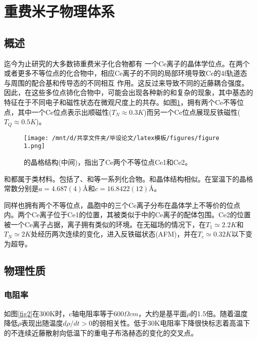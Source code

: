 \section{重费米子物理体系}
\subsection{概述}
迄今为止研究的大多数铈重费米子化合物都有 一个Ce离子的晶体学位点。在两个或者更多不等位点的化合物中，相应Ce离子的不同的局部环境导致Ce的4f轨道态与周围的配合基和传导态的不同相互 作用。这反过来导致不同的近藤耦合强度。因此，在这些多位点铈化合物中，可能会出现各种新的和复杂的现象，其中基态的特征在于不同电子和磁性状态在微观尺度上的共存。如图\ref{fig1}，拥有两个Ce不等位点，其中一个Ce位点表示出顺磁性($T_N \approx 0.3K$)而另一个Ce位点展现反铁磁性($T_Q \approx 0.5K$)。

\begin{figure}[h]
    \centering
    \texttt{[image: /mnt/d/共享文件夹/毕设论文/latex模板/figures/figure 1.png]}
    \caption{\Songti {}的晶格结构(中间)，指出了Ce两个不等位点Ce1和Ce2\cite{8}。}%
    \label{fig1}
\end{figure}


和都属于类材料。包括了、和等一系列化合物。和晶体结构相似。在室温下的晶格常数分别是$a=4.687(4)$\AA 和$c=16.8422(12)$\AA。

同样也拥有两个不等位点，晶胞中的三个Ce离子分布在晶体学上不等价的位点内。两个Ce离子位于Ce1的位置，其被类似于中的Ce离子的配体包围。Ce2的位置被一个Ce离子占据，离子拥有类似的环境。在无磁场的情况下，在$T_1 \simeq 2.2K$和$T_N \simeq 2K$处经历两次连续的变化，进入反铁磁状态(AFM)，并在$T_c \simeq 0.32K$以下变为超导。

\subsection{物理性质}
\subsubsection{电阻率}
如图\ref{fig2}在300K时，c轴电阻率等于$600 \Omega cm$，大约是基平面$\rho$的1.5倍。随着温度降低$\rho$表现出随温度$d \rho /d t > 0$的弱相关性。低于30K电阻率下降很快标志着高温下的不连续近藤散射向低温下的重电子布洛赫态的变化的交叉点。

